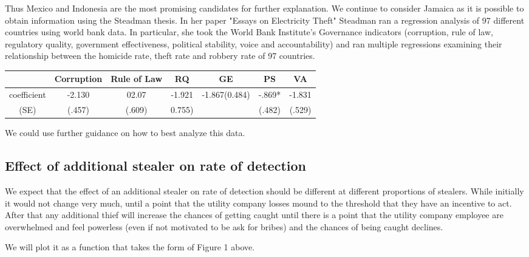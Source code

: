 \documentclass{article}
\begin{document}
Thus Mexico and Indonesia are the most promising candidates for further explanation. We continue to consider Jamaica as it is possible to obtain information using the Steadman thesis. In her paper "Essays on Electricity Theft" Steadman ran a regression analysis of 97 different countries using world bank data. In particular, she took the World Bank Institute's Governance indicators (corruption, rule of law, regulatory quality, government effectiveness, political stability, voice and accountability) and ran multiple regressions examining their relationship between the homicide rate, theft rate and robbery rate of 97 countries. 
\begin{center}

 \centering
\begin{tabular}[h]{c|c|c|c|c|c|c}\centering
  & Corruption & Rule of Law & RQ & GE & PS & VA \\
\hline
coefficient & -2.130 & 02.07 & -1.921 & -1.867(0.484) & -.869* & -1.831 \\
(SE) & (.457) & (.609) &0.755) & & (.482) & (.529)
\end{tabular}

\end{center}

We could use further guidance on how to best analyze this data.

\subsection{Effect of additional stealer on rate of detection}

We expect that the effect of an additional stealer on rate of detection should be different at different proportions of stealers. While initially it would not change very much, until a point that the utility company losses mound to the threshold that they have an incentive to act. After that any additional thief will increase the chances of getting caught until there is a point that the utility company employee are overwhelmed and feel powerless (even if not motivated to be ask for bribes) and the chances of being caught declines. 

We will plot it as a function that takes the form of Figure 1 above.
\begin{figure}
\end{figure}
\end{document}
